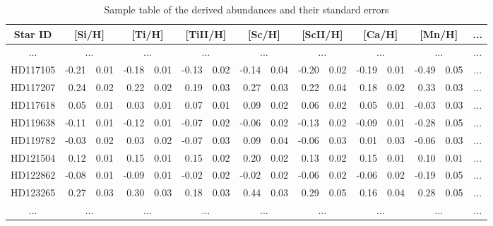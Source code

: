 \documentclass[dvips,12pt,a4paper]{report}
\begin{document}
{{%
\begin{table}[h]\scriptsize
\centering
\caption[Sample table of the abundance derived for the species]{Sample table of the derived abundances and their standard errors}
  \label{abundance_table}
  \begin{tabular}{ c r@{$\pm$}l r@{$\pm$}l r@{$\pm$}l r@{$\pm$}l r@{$\pm$}l r@{$\pm$}l r@{$\pm$}l c}
  \hline
  \hline
Star ID & \multicolumn {2}{c}{[Si/H]} & \multicolumn {2}{c}{[Ti/H]} & \multicolumn {2}{c}{[TiII/H]} & \multicolumn {2}{c}{[Sc/H]} & \multicolumn {2}{c}{[ScII/H]} & \multicolumn {2}{c}{[Ca/H]} & \multicolumn {2}{c}{[Mn/H]} & ... \\
\hline
... & \multicolumn {2}{c}{...} & \multicolumn {2}{c}{...} & \multicolumn {2}{c}{...} & \multicolumn {2}{c}{...} & \multicolumn {2}{c}{...} & \multicolumn {2}{c}{...} & \multicolumn {2}{c}{...} & ... \\
HD117105 & -0.21 & 0.01 & -0.18 & 0.01 & -0.13 & 0.02 & -0.14 & 0.04 & -0.20 & 0.02 & -0.19 & 0.01 & -0.49 & 0.05 & ...\\
HD117207 &  0.24 & 0.02 &  0.22 & 0.02 &  0.19 & 0.03 &  0.27 & 0.03 &  0.22 & 0.04 &  0.18 & 0.02 &  0.33 & 0.03 & ...\\
HD117618 &  0.05 & 0.01 &  0.03 & 0.01 &  0.07 & 0.01 &  0.09 & 0.02 &  0.06 & 0.02 &  0.05 & 0.01 & -0.03 & 0.03 & ...\\
HD119638 & -0.11 & 0.01 & -0.12 & 0.01 & -0.07 & 0.02 & -0.06 & 0.02 & -0.13 & 0.02 & -0.09 & 0.01 & -0.28 & 0.05 & ...\\
HD119782 & -0.03 & 0.02 &  0.03 & 0.02 & -0.07 & 0.03 &  0.09 & 0.04 & -0.06 & 0.03 &  0.01 & 0.03 & -0.06 & 0.03 & ...\\
HD121504 &  0.12 & 0.01 &  0.15 & 0.01 &  0.15 & 0.02 &  0.20 & 0.02 &  0.13 & 0.02 &  0.15 & 0.01 &  0.10 & 0.01 & ...\\
HD122862 & -0.08 & 0.01 & -0.09 & 0.01 & -0.02 & 0.02 & -0.02 & 0.02 & -0.06 & 0.02 & -0.06 & 0.02 & -0.19 & 0.05 & ...\\
HD123265 &  0.27 & 0.03 &  0.30 & 0.03 &  0.18 & 0.03 &  0.44 & 0.03 &  0.29 & 0.05 &  0.16 & 0.04 &  0.28 & 0.05 & ...\\
... & \multicolumn {2}{c}{...} & \multicolumn {2}{c}{...} & \multicolumn {2}{c}{...} & \multicolumn {2}{c}{...} & \multicolumn {2}{c}{...} & \multicolumn {2}{c}{...} & \multicolumn {2}{c}{...}  & ... \\
\hline
\end{tabular}
\end{table}

}}
\end{document}
